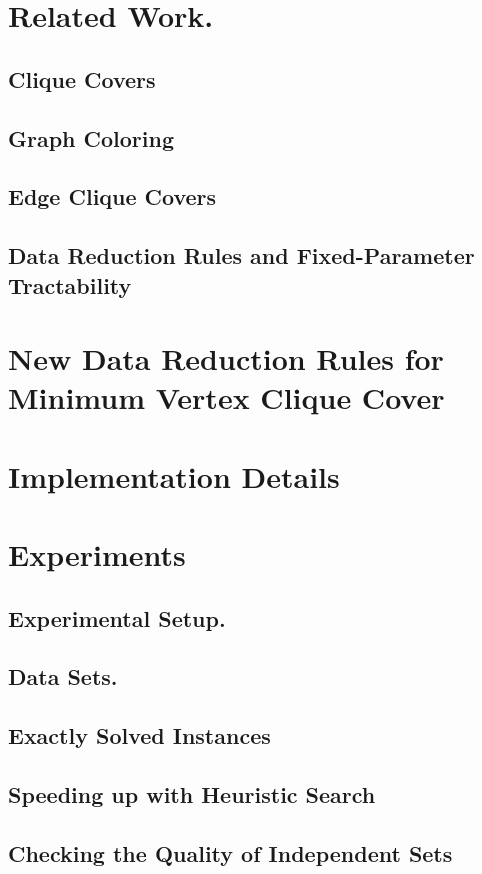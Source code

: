 \documentclass[sigconf]{acmart}
\begin{document}
\section{Related Work.}
\subsection{Clique Covers}
\subsection{Graph Coloring}
\subsection{Edge Clique Covers}
\subsection{Data Reduction Rules and Fixed-Parameter Tractability}
\label{sec:RelatedWork}


\section{New Data Reduction Rules for Minimum Vertex Clique Cover}
\section{Implementation Details}
\section{Experiments}
\subsection{Experimental Setup.}
\subsection{Data Sets.}
\subsection{Exactly Solved Instances}
\subsection{Speeding up with Heuristic Search}
\subsection{Checking the Quality of Independent Sets}



\end{document}
